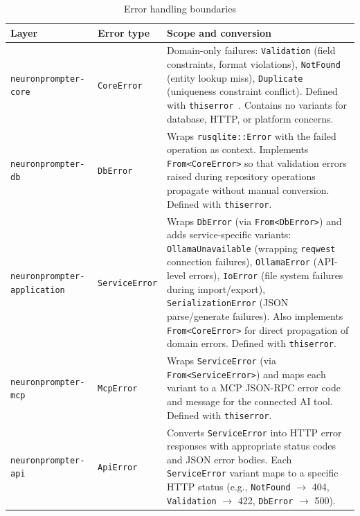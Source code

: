 \documentclass[a4paper, 11pt, oneside]{report}
\begin{document}
\begin{table}[H]
  \centering
  \caption{Error handling boundaries}
  \label{tab:error-boundaries}
  \begin{tabularx}{\textwidth}{l l X}
    \toprule
    \textbf{Layer} & \textbf{Error type} & \textbf{Scope and conversion} \\
    \midrule
    \texttt{neuronprompter-core}  & \texttt{CoreError} &
      Domain-only failures: \texttt{Validation} (field constraints,
      format violations), \texttt{NotFound} (entity lookup miss),
      \texttt{Duplicate} (uniqueness constraint conflict).  Defined
      with \texttt{thiserror}~\cite{thiserror}.  Contains no variants
      for database, HTTP, or platform concerns. \\
    \texttt{neuronprompter-db}    & \texttt{DbError} &
      Wraps \texttt{rusqlite::Error} with the failed operation as
      context.  Implements \texttt{From<CoreError>} so that validation
      errors raised during repository operations propagate without
      manual conversion.  Defined with \texttt{thiserror}. \\
    \texttt{neuronprompter-application} & \texttt{ServiceError} &
      Wraps \texttt{DbError} (via \texttt{From<DbError>}) and adds
      service-specific variants: \texttt{OllamaUnavailable} (wrapping
      \texttt{reqwest} connection failures),
      \texttt{OllamaError} (API-level errors),
      \texttt{IoError} (file system failures during import/export),
      \texttt{SerializationError} (JSON parse/generate failures).
      Also implements \texttt{From<CoreError>} for direct propagation
      of domain errors.  Defined with \texttt{thiserror}. \\
    \texttt{neuronprompter-mcp}   & \texttt{McpError} &
      Wraps \texttt{ServiceError} (via \texttt{From<ServiceError>})
      and maps each variant to a MCP JSON-RPC error code and message
      for the connected AI tool.  Defined with \texttt{thiserror}. \\
    \texttt{neuronprompter-api}   & \texttt{ApiError} &
      Converts \texttt{ServiceError} into HTTP error responses with
      appropriate status codes and JSON error bodies.  Each
      \texttt{ServiceError} variant maps to a specific HTTP status
      (e.g., \texttt{NotFound} $\to$ 404,
      \texttt{Validation} $\to$ 422,
      \texttt{DbError} $\to$ 500). \\
    \bottomrule
  \end{tabularx}
\end{table}
\end{document}
